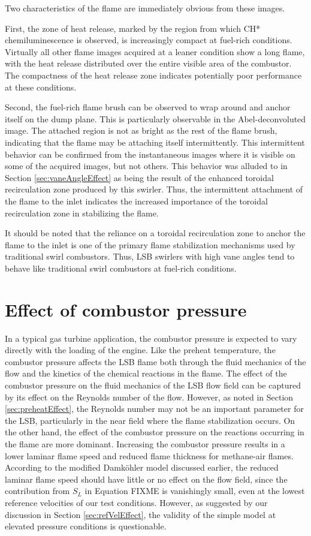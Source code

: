 Two characteristics of the flame are immediately obvious from these images.

First, the zone of heat release, marked by the region from which CH* chemiluminescence is observed, is increasingly compact at fuel-rich conditions.
Virtually all other flame images acquired at a leaner condition show a long flame, with the heat release distributed over the entire visible area of the combustor.
The compactness of the heat release zone indicates potentially poor  performance at these conditions.

Second, the fuel-rich flame brush can be observed to wrap around and anchor itself on the dump plane.
This is particularly observable in the Abel-deconvoluted image.
The attached region is not as bright as the rest of the flame brush, indicating that the flame may be attaching itself intermittently.
This intermittent behavior can be confirmed from the instantaneous images where it is visible on some of the acquired images, but not others.
This behavior was alluded to in Section \ref{sec:vaneAngleEffect} as being the result of the enhanced toroidal recirculation zone produced by this swirler.
Thus, the intermittent attachment of the flame to the inlet indicates the increased importance of the toroidal recirculation zone in stabilizing the flame.

It should be noted that the reliance on a toroidal recirculation zone to anchor the flame to the inlet is one of the primary flame stabilization mechanisms used by traditional swirl combustors.
Thus, LSB swirlers with high vane angles tend to behave like traditional swirl combustors at fuel-rich conditions.

\section{Effect of combustor pressure}

In a typical gas turbine application, the combustor pressure is expected to vary directly with the loading of the engine.
Like the preheat temperature, the combustor pressure affects the LSB flame both through the fluid mechanics of the flow and the kinetics of the chemical reactions in the flame.
The effect of the combustor pressure on the fluid mechanics of the LSB flow field can be captured by its effect on the Reynolds number of the flow.
However, as noted in Section \ref{sec:preheatEffect}, the Reynolds number may not be an important parameter for the LSB, particularly in the near field where the flame stabilization occurs.
On the other hand, the effect of the combustor pressure on the reactions occurring in the flame are more dominant.
Increasing the combustor pressure results in a lower laminar flame speed and reduced flame thickness for methane-air flames.
According to the modified Damk\"ohler model discussed earlier, the reduced laminar flame speed should have little or no effect on the flow field, since the contribution from \(S_L\) in Equation FIXME is vanishingly small, even at the lowest reference velocities of our test conditions.
However, as suggested by our discussion in Section \ref{sec:refVelEffect}, the validity of the simple model at elevated pressure conditions is questionable.

